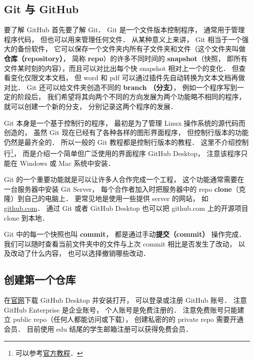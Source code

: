 
\subsection{Git 与 GitHub}
要了解 GitHub 首先要了解 Git． Git 是一个文件版本控制程序， 通常用于管理程序代码， 但也可以用来管理任何文件． 从某种意义上来讲， Git 相当于一个强大的备份软件， 它可以保存一个文件夹内所有子文件夹和文件（这个文件夹叫做 \textbf{仓库（repository）}， 简称 \textbf{repo}）的许多不同时间的 \textbf{snapshot}（快照， 即所有文件某时刻的内容），而且可以对比出每个快 snapshot 相对上一个的变化． 但查看变化仅限文本文档， 但 word 和 pdf 可以通过插件先自动转换为文本文档再做对比． Git 还可以给文件夹创造不同的 \textbf{branch （分支）}， 例如一个程序写到一定的阶段后， 我们希望将其向两个不同的方向发展为两个功能略不相同的程序，就可以创建一个新的分支， 分别记录这两个程序的发展．

Git 本身是一个基于控制行的程序， 最初是为了管理 Linux 操作系统的源代码而创造的， 虽然 Git 现在已经有了各种各样的图形界面程序， 但控制行版本的功能仍然是最齐全的． 所以一般的 Git 教程都是控制行版本的教程． 这里不介绍控制行\footnote{可以参考\href{https://git-scm.com/book/en/v2}{官方教程}．}， 而是介绍一个简单但广泛使用的界面程序 GitHub Desktop， 注意该程序只能在 Windows 或 Mac 系统中安装．

Git 的一个重要功能就是可以让许多人合作完成一个工程， 这个功能通常需要在一台服务器中安装 Git Server， 每个合作者加入时把服务器中的 repo \textbf{clone}（克隆）到自己的电脑上． 更常见地是使用一些提供 server 的网站， 如 \href{https://github.com}{github.com}． 通过 Git 或者 GitHub Desktop 也可以把 github.com 上的开源项目 clone 到本地．

Git 中的每一个快照也叫 \textbf{commit}， 都是通过手动\textbf{提交（commit）} 操作完成． 我们可以随时查看当前文件夹中的文件与上次 commit 相比是否发生了改动， 以及改动了什么内容， 也可以选择撤销哪些改动．
 
\subsection{创建第一个仓库}
在\href{https://desktop.github.com/}{官网}下载 GitHub Desktop 并安装打开， 可以登录或注册 GitHub 账号． 注意 GitHub Enterprise 是企业账号， 个人账号是免费注册的． 注意免费账号只能建立 public repo（任何人都能访问或下载）， 创建私密的的 private repo 需要开通会员． 目前使用 edu 结尾的学生邮箱注册可以获得免费会员．

